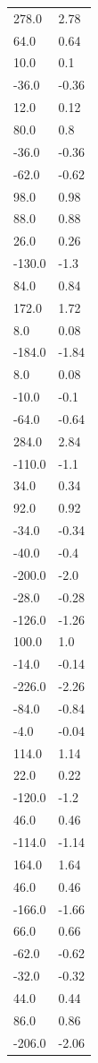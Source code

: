 \begin{longtable}{ll}
278.0 & 2.78 \\
64.0 & 0.64 \\
10.0 & 0.1 \\
-36.0 & -0.36 \\
12.0 & 0.12 \\
80.0 & 0.8 \\
-36.0 & -0.36 \\
-62.0 & -0.62 \\
98.0 & 0.98 \\
88.0 & 0.88 \\
26.0 & 0.26 \\
-130.0 & -1.3 \\
84.0 & 0.84 \\
172.0 & 1.72 \\
8.0 & 0.08 \\
-184.0 & -1.84 \\
8.0 & 0.08 \\
-10.0 & -0.1 \\
-64.0 & -0.64 \\
284.0 & 2.84 \\
-110.0 & -1.1 \\
34.0 & 0.34 \\
92.0 & 0.92 \\
-34.0 & -0.34 \\
-40.0 & -0.4 \\
-200.0 & -2.0 \\
-28.0 & -0.28 \\
-126.0 & -1.26 \\
100.0 & 1.0 \\
-14.0 & -0.14 \\
-226.0 & -2.26 \\
-84.0 & -0.84 \\
-4.0 & -0.04 \\
114.0 & 1.14 \\
22.0 & 0.22 \\
-120.0 & -1.2 \\
46.0 & 0.46 \\
-114.0 & -1.14 \\
164.0 & 1.64 \\
46.0 & 0.46 \\
-166.0 & -1.66 \\
66.0 & 0.66 \\
-62.0 & -0.62 \\
-32.0 & -0.32 \\
44.0 & 0.44 \\
86.0 & 0.86 \\
-206.0 & -2.06 \\

\end{longtable}
